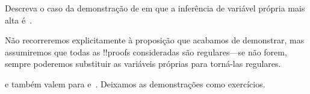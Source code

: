 \documentclass[../../../include/open-logic-section]{subfiles}
\begin{document}
\begin{prob}
Descreva o caso da demonstração de  em que a
inferência de variável própria mais alta é~\Elim{\lexists}.
\end{prob}

Não recorreremos explicitamente à proposição que acabamos de
demonstrar, mas assumiremos que todas as !!{proof}s consideradas são
regulares---se não forem, sempre poderemos substituir as variáveis
próprias para torná-las regulares.

 e  também valem para
 e~. Deixamos as demonstrações como exercícios.
\end{document}
